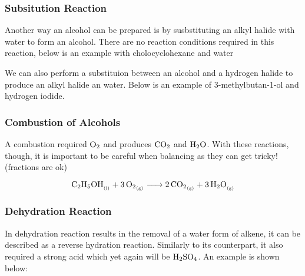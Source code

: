 \documentclass[12pt, a4paper]{article}
\newcommand{\gas}{_{\text{(g)}}}
\newcommand{\liquid}{_{\text{(l)}}}
\begin{document}

    
    \subsubsection{Subsitution Reaction}

    Another way an alcohol can be prepared is by susbstituting an alkyl halide with water to form an alcohol. 
    There are no reaction conditions required in this reaction, below is an example with cholocyclohexane and water

    \begin{center}
    \end{center}

    We can also perform a substituion between an alcohol and a hydrogen halide to produce 
    an alkyl halide an water. Below is an example of 3-methylbutan-1-ol and hydrogen iodide.

    \begin{center}
    \end{center}

    \subsubsection{Combustion of Alcohols}

    A combustion required $\ce{O2}$ and produces $\ce{CO2}$ and $\ce{H2O}$. With these reactions, though, 
    it is important to be careful when balancing as they can get tricky! (fractions are ok)

    \[
        \ce{C2H5OH_{\liquid} + 3O2_{\gas} -> 2CO2_{\gas} + 3H2O_{\gas}}    
    \]

    \subsubsection{Dehydration Reaction}

    In dehydration reaction results in the removal of a water form of alkene, it can be described
    as a reverse hydration reaction. Similarly to its counterpart, it also required a strong acid
    which yet again will be $\ce{H2SO4}$. An example is shown below:

\end{document}
